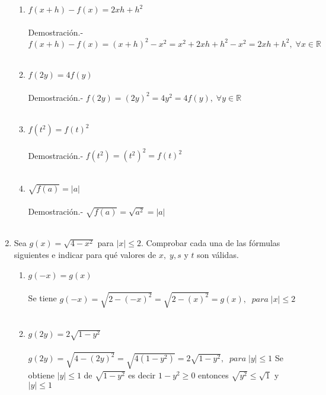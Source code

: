\begin{enumerate}
\begin{enumerate}[\bfseries (a)]
                \item $f(x+h) - f(x) = 2xh + h^2$\\\\
                Demostración.- \; $f(x+h) - f(x) = (x+h)^2 -x^2 = x^2 + 2xh +h^2 - x^2 = 2xh + h^2, \; \forall x \in \mathbb{R}$\\\\

                \item $f(2y) = 4f(y)$\\\\
                Demostración.- \; $f(2y) = (2y)^2 = 4y^2 = 4 f(y), \; \forall y \in \mathbb{R}$\\\\
                \item $f(t^2)=f(t)^2$\\\\
                Demostración.- \; $f(t^2) = (t^2)^2 = f(t)^2$\\\\
                \item $\sqrt{f(a)} = |a|$\\\\
                Demostración.- \; $\sqrt{f(a)} = \sqrt{a^2} = |a|$\\\\
            \end{enumerate}

        \item Sea $g(x) = \sqrt{4-x^2}$ para $|x| \leq 2$. Comprobar cada una de las fórmulas siguientes e indicar para qué valores de $x, \; y, s$ y $t$ son válidas.
            \begin{enumerate}[\bfseries (a)]
                \item $g(-x) = g(x)$\\\\
                Se tiene $g(-x)=\sqrt{2-(-x)^2} = \sqrt{2-(x)^2} = g(x), \; \; para \; |x| \leq 2$\\\\

                \item $g(2y) = 2\sqrt{1-y^2}$\\\\
                $g(2y)=\sqrt{4-(2y)^2}= \sqrt{4(1-y^2)} = 2 \sqrt{1-y^2}, \; \; para \; |y|\leq 1$ Se obtiene $|y| \leq 1$  de $\sqrt{1-y^2}$ es decir $1-y^2 \geq 0$ entonces $\sqrt{y^2} \leq \sqrt{1}$ \; y \; $|y|\leq 1$\\\\


\end{enumerate}
\end{enumerate}
